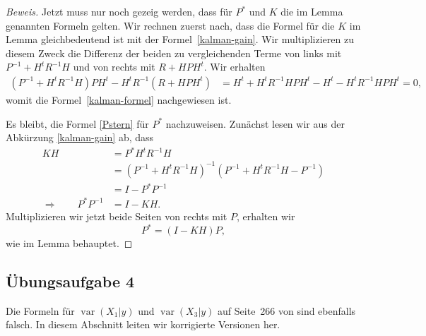 \begin{proof}[Beweis]
Jetzt muss nur noch gezeig werden, dass für $P^*$ und $K$ die im Lemma
genannten Formeln gelten.
Wir rechnen zuerst nach, dass die Formel für die $K$ im Lemma gleichbedeutend
ist mit der Formel~\eqref{kalman-gain}.
Wir multiplizieren zu diesem Zweck die Differenz der beiden zu vergleichenden
Terme von links mit
$P^{-1}+H^tR^{-1}H$
und von rechts mit $R+HPH^t$.
Wir erhalten
\begin{align*}
(P^{-1}+H^tR^{-1}H)PH^t
-
H^tR^{-1}(R+HPH^t)
&=
H^t + H^tR^{-1}HPH^t
- H^t - H^tR^{-1}HPH^t
=0,
\end{align*}
womit die Formel~\eqref{kalman-formel} nachgewiesen ist.

Es bleibt, die Formel \eqref{Pstern} für $P^*$ nachzuweisen.
Zunächst lesen wir aus der Abkürzung \eqref{kalman-gain} ab, dass
\begin{align*}
KH
&=
P^*
H^tR^{-1}H
\\
&=
(P^{-1}+H^tR^{-1}H)^{-1}(P^{-1}
+H^tR^{-1}H
-P^{-1}
)
\\
&=
I- P^* P^{-1}
\\
\Rightarrow\qquad
P^*P^{-1}&=I-KH.
\end{align*}
Multiplizieren wir jetzt beide Seiten von rechts mit $P$, erhalten wir
\[
P^*
=
(I-KH)P,
\]
wie im Lemma behauptet.
\end{proof}

\subsection{Übungsaufgabe 4\label{skript:aufgabe4}}
Die Formeln für
$\operatorname{var}(X_1|y)$
und
$\operatorname{var}(X_3|y)$
auf Seite~266 von \cite{skript:kaperengler} sind ebenfalls falsch.
In diesem Abschnitt leiten wir korrigierte Versionen her.

